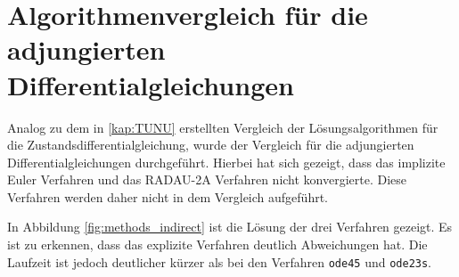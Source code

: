 \chapter{Algorithmenvergleich für die adjungierten Differentialgleichungen}\label{appendix:methods}
Analog zu dem in \autoref{kap:TUNU} erstellten Vergleich der Lösungsalgorithmen für die Zustandsdifferentialgleichung, wurde der Vergleich für die adjungierten Differentialgleichungen durchgeführt.
Hierbei hat sich gezeigt, dass das implizite Euler Verfahren und das RADAU-2A Verfahren nicht konvergierte. Diese Verfahren werden daher nicht in dem Vergleich aufgeführt.

In Abbildung \autoref{fig:methods_indirect} ist die Lösung der drei Verfahren gezeigt. Es ist zu erkennen, dass das explizite Verfahren deutlich Abweichungen hat. Die Laufzeit ist jedoch deutlicher kürzer als bei den Verfahren \verb+ode45+ und \verb+ode23s+.

\begin{figure}[htbp]
    \centering 
    \qquad
     \\

    \qquad
     \\

    \qquad
     \\

    \qquad
     \\

     \label{fig:methods_indirect}
\end{figure}

